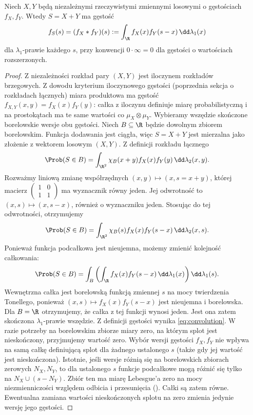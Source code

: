 \begin{twierdzenie}[Splot]
Niech $X,Y$ będą niezależnymi rzeczywistymi zmiennymi losowymi
o gęstościach $f_X,f_Y$. Wtedy $S=X+Y$ ma gęstość
\begin{equation}\label{eq:convolution}
 f_S(s)=(f_X*f_Y)(s)
 :=\int_\R f_X(x)f_Y(s-x)\,\dd\lambda_1(x)
\end{equation}
dla $\lambda_1$-prawie każdego $s$, przy konwencji
$0\cdot\infty=0$ dla gęstości o wartościach rozszerzonych.
\end{twierdzenie}
\begin{proof}
Z niezależności rozkład pary $(X,Y)$ jest iloczynem
rozkładów brzegowych. Z dowodu kryterium iloczynowego
gęstości (poprzednia sekcja o rozkładach łącznych) miara
produktowa ma gęstość $f_{X,Y}(x,y)=f_X(x)f_Y(y)$:
całka z iloczynu definiuje miarę probabilistyczną
i na prostokątach ma te same wartości co
$\mu_X\otimes\mu_Y$. Wybieramy wszędzie skończone
borelowskie wersje obu gęstości.
Niech $B\subseteq\R$ będzie dowolnym zbiorem borelowskim.
Funkcja dodawania jest ciągła, więc $S=X+Y$ jest mierzalna
jako złożenie z wektorem losowym $(X,Y)$.
Z definicji rozkładu łącznego
\[
\Prob(S\in B)=\int_{\R^2}\chi_B(x+y)
 f_X(x)f_Y(y)\,\dd\lambda_2(x,y).
\]
Rozważmy liniową zmianę współrzędnych
$(x,y)\mapsto (x,s=x+y)$, której macierz
$\left(\begin{smallmatrix}1&0\\1&1\end{smallmatrix}\right)$
ma wyznacznik równy jeden. Jej odwrotność to
$(x,s)\mapsto(x,s-x)$, również o wyznaczniku jeden.
Stosując 
do tej odwrotności, otrzymujemy
\[
\Prob(S\in B)=\int_{\R^2}\chi_B(s)
 f_X(x)f_Y(s-x)\,\dd\lambda_2(x,s).
\]
Ponieważ funkcja podcałkowa jest nieujemna,
możemy zmienić kolejność całkowania:
\[
\Prob(S\in B)=\int_B\left(
\int_\R f_X(x)f_Y(s-x)\,\dd\lambda_1(x)
\right)\dd\lambda_1(s).
\]
Wewnętrzna całka jest borelowską funkcją zmiennej $s$
na mocy twierdzenia Tonellego, ponieważ $(x,s)\mapsto
f_X(x)f_Y(s-x)$ jest nieujemna i borelowska.
Dla $B=\R$ otrzymujemy, że całka z tej funkcji wynosi jeden.
Jest ona zatem skończona $\lambda_1$-prawie wszędzie.
Z definicji gęstości wynika \eqref{eq:convolution}.
W razie potrzeby na borelowskim zbiorze miary zero,
na którym splot jest nieskończony, przyjmujemy wartość zero.
Wybór wersji gęstości $f_X,f_Y$ nie wpływa na samą całkę
definiującą splot dla żadnego ustalonego $s$ (także gdy
jej wartość jest nieskończona). Istotnie, jeśli wersje
różnią się na borelowskich zbiorach zerowych $N_X,N_Y$,
to dla ustalonego $s$ funkcje podcałkowe mogą różnić się
tylko na $N_X\cup(s-N_Y)$. Zbiór ten ma miarę Lebesgue'a
zero na mocy niezmienniczości względem odbicia i przesunięcia
().
Całki są zatem równe. Ewentualna zamiana wartości nieskończonych
splotu na zero zmienia jedynie wersję jego gęstości.
\end{proof}

